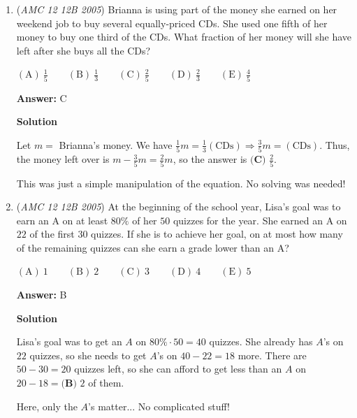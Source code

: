 \begin{enumerate}
\textbf{Solution 2}

Try the answer choices one by one. Upon examination, it is quite obvious that the answer is $\boxed{\textbf{(D) }20}.$ Very fast.

 
Solution by franzliszt

 


	\item (\textit{AMC 12 12B 2005}) Brianna is using part of the money she earned on her weekend job to buy several equally-priced CDs. She used one fifth of her money to buy one third of the CDs. What fraction of her money will she have left after she buys all the CDs? 


 $\mathrm{(A)}\ \frac15      \qquad \mathrm{(B)}\ \frac13      \qquad \mathrm{(C)}\ \frac25      \qquad \mathrm{(D)}\ \frac23      \qquad \mathrm{(E)}\ \frac45$

 \textbf{Answer: }C



\textbf{Solution}

Let $m =$ Brianna's money.  We have $\frac15 m = \frac13 (\mbox{CDs}) \Rightarrow \frac35 m = (\mbox{CDs})$.  Thus, the money left over is $m-\frac35m = \frac25m$, so the answer is $\boxed{\textbf{(C) }\frac{2}{5}}$.

 This was just a simple manipulation of the equation. No solving was needed!

 


	\item (\textit{AMC 12 12B 2005}) At the beginning of the school year, Lisa's goal was to earn an A on at least $80\%$ of her $50$ quizzes for the year.  She earned an A on $22$ of the first $30$ quizzes.  If she is to achieve her goal, on at most how many of the remaining quizzes can she earn a grade lower than an A?


 $\mathrm{(A)}\ 1      \qquad \mathrm{(B)}\ 2      \qquad \mathrm{(C)}\ 3      \qquad \mathrm{(D)}\ 4      \qquad \mathrm{(E)}\ 5$

 \textbf{Answer: }B



\textbf{Solution}

Lisa's goal was to get an $A$ on $80\% \cdot 50 = 40$ quizzes.  She already has $A$'s on $22$ quizzes, so she needs to get $A$'s on $40-22=18$ more.  There are $50-30=20$ quizzes left, so she can afford to get less than an $A$ on $20-18=\boxed{\textbf{(B) }2}$ of them.

 Here, only the $A$'s matter... No complicated stuff!


\end{enumerate}
